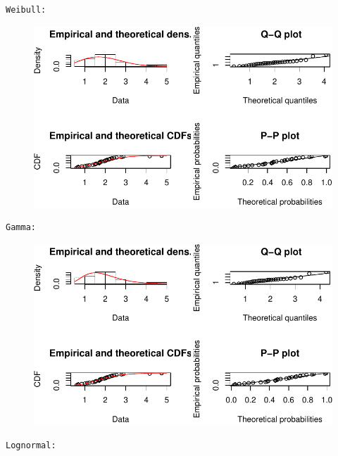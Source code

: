 \documentclass[
  letterpaper,
  DIV=11,
  numbers=noendperiod]{scrartcl}
\begin{document}
\begin{verbatim}
Weibull: 
\end{verbatim}

\begin{figure}[H]

{\centering \includegraphics{quiz5_files/figure-pdf/unnamed-chunk-33-2.pdf}

}

\end{figure}

\begin{verbatim}
Gamma: 
\end{verbatim}

\begin{figure}[H]

{\centering \includegraphics{quiz5_files/figure-pdf/unnamed-chunk-33-3.pdf}

}

\end{figure}

\begin{verbatim}
Lognormal: 
\end{verbatim}
\end{document}
